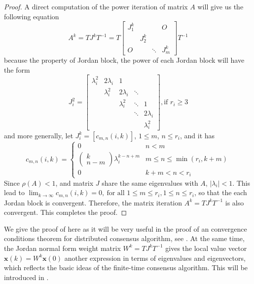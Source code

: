 \begin{proof}
A direct computation of the power iteration of matrix $A$ will give
us the following equation
\[
A^{k}=TJ^{k}T^{-1}=T\left[\begin{array}{cccc}
J_{1}^{k} &  &  & O\\
 & J_{2}^{k}\\
O &  & \ddots & J_{m}^{k}
\end{array}\right]T^{-1}
\]
because the property of Jordan block, the power of each Jordan block
will have the form
\[
J_{i}^{2}=\left[\begin{array}{ccccc}
\lambda_{i}^{2} & 2\lambda_{i} & 1\\
 & \lambda_{i}^{2} & 2\lambda_{i} & \ddots\\
 &  & \lambda_{i}^{2} & \ddots & 1\\
 &  &  & \ddots & 2\lambda_{i}\\
 &  &  &  & \lambda_{i}^{2}
\end{array}\right],\mbox{if }r_{i}\geq3
\]
 and more generally, let $J_{i}^{k}=\left[c_{m,n}\left(i,k\right)\right]$,
$1\leq m$, $n\leq r_{i}$, and it has 
\[
c_{m,n}\left(i,k\right)=\begin{cases}
0 & n<m\\
\left(\begin{array}{c}
k\\
n-m
\end{array}\right)\lambda_{i}^{k-n+m} & m\leq n\leq\min\left(r_{i},k+m\right)\\
0 & k+m<n<r_{i}
\end{cases}
\]
 Since $\rho\left(A\right)<1$, and matrix $J$ share the same eigenvalues
with $A$, $\left|\lambda_{i}\right|<1$. This lead to $\lim_{k\to\infty}c_{m,n}\left(i,k\right)=0,\:\mbox{for all }1\leq m\leq r_{i},1\leq n\leq r_{i}$,
so that the each Jordan block is convergent. Therefore, the matrix
iteration $A^{k}=TJ^{k}T^{-1}$ is also convergent. This completes
the proof. 
\end{proof}
We give the proof of 
here as it will be very useful in the proof of an convergence conditions
theorem for distributed consensus algorithm, see .
At the same time, the Jordan normal form weight matrix $W^{k}=TJ^{k}T^{-1}$
gives the local value vector $\mathbf{x}\left(k\right)=W^{k}\mathbf{x}\left(0\right)$
another expression in terms of eigenvalues and eigenvectors, which
reflects the basic ideas of the finite-time consensus algorithm. This
will be introduced in . 


